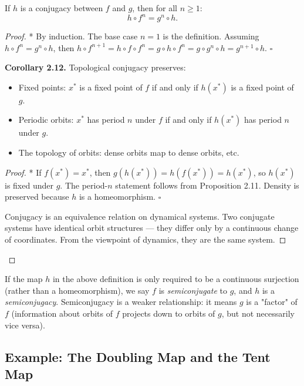 \begin{proposition}\label{prop:2.11.}
If $h$ is a conjugacy between $f$ and $g$, then for all $n \geq 1$:
\[
h \circ f^n = g^n \circ h.
\]
\end{proposition}


\begin{proof}
* By induction. The base case $n = 1$ is the definition. Assuming $h \circ f^n = g^n \circ h$, then $h \circ f^{n+1} = h \circ f \circ f^n = g \circ h \circ f^n = g \circ g^n \circ h = g^{n+1} \circ h$. $\square$

\textbf{Corollary 2.12.} Topological conjugacy preserves:

\begin{itemize}[nosep]
  \item Fixed points: $x^*$ is a fixed point of $f$ if and only if $h(x^*)$ is a fixed point of $g$.
  \item Periodic orbits: $x^*$ has period $n$ under $f$ if and only if $h(x^*)$ has period $n$ under $g$.
  \item The topology of orbits: dense orbits map to dense orbits, etc.
\end{itemize}

\begin{proof}
* If $f(x^*) = x^*$, then $g(h(x^*)) = h(f(x^*)) = h(x^*)$, so $h(x^*)$ is fixed under $g$. The period-$n$ statement follows from Proposition 2.11. Density is preserved because $h$ is a homeomorphism. $\square$

Conjugacy is an equivalence relation on dynamical systems. Two conjugate systems have identical orbit structures --- they differ only by a continuous change of coordinates. From the viewpoint of dynamics, they are the same system.

\end{proof}

\end{proof}

\begin{definition}\label{def:2.13.}
If the map $h$ in the above definition is only required to be a continuous surjection (rather than a homeomorphism), we say $f$ is \textit{semiconjugate} to $g$, and $h$ is a \textit{semiconjugacy}. Semiconjugacy is a weaker relationship: it means $g$ is a "factor" of $f$ (information about orbits of $f$ projects down to orbits of $g$, but not necessarily vice versa).
\end{definition}


\subsection{Example: The Doubling Map and the Tent Map}\label{sec:2.6.1}

